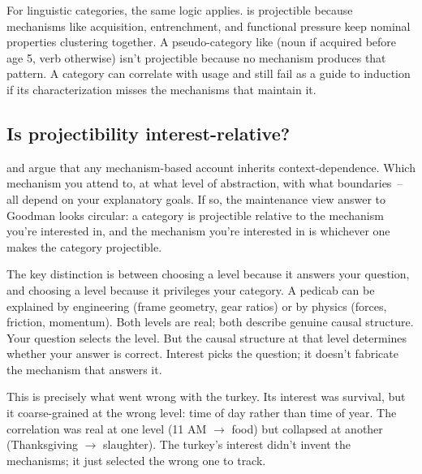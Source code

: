 For linguistic categories, the same logic applies.  is projectible because mechanisms like acquisition, entrenchment, and functional pressure keep nominal properties clustering together. A pseudo-category like  (noun if acquired before age 5, verb otherwise) isn't projectible because no mechanism produces that pattern. A category can correlate with usage and still fail as a guide to induction if its characterization misses the mechanisms that maintain it.

\subsection{Is projectibility interest-relative?}
\label{sec:7:interest-relativity}

\textcite{craver2009} and \textcite{onishi2022} argue that any mechanism-based account inherits context-dependence. Which mechanism you attend to, at what level of abstraction, with what boundaries~-- all depend on your explanatory goals. If so, the maintenance view answer to Goodman looks circular: a category is projectible relative to the mechanism you're interested in, and the mechanism you're interested in is whichever one makes the category projectible.

The key distinction is between choosing a level because it answers your question, and choosing a level because it privileges your category. A pedicab can be explained by engineering (frame geometry, gear ratios) or by physics (forces, friction, momentum). Both levels are real; both describe genuine causal structure. Your question selects the level. But the causal structure at that level determines whether your answer is correct. Interest picks the question; it doesn't fabricate the mechanism that answers it.

This is precisely what went wrong with the turkey. Its interest was survival, but it coarse-grained at the wrong level: time of day rather than time of year. The correlation was real at one level (11 AM $\rightarrow$ food) but collapsed at another (Thanksgiving $\rightarrow$ slaughter). The turkey's interest didn't invent the mechanisms; it just selected the wrong one to track.

